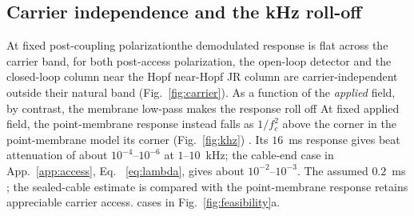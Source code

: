 \documentclass[11pt,a4paper]{article}
\providecommand{\DIFaddtex}[1]{{\protect\color{blue} \sf #1}} %
\providecommand{\DIFdeltex}[1]{{\protect\color{red} \scriptsize #1}} %
\providecommand{\DIFaddbegin}{} %
\providecommand{\DIFaddend}{} %
\providecommand{\DIFdelbegin}{} %
\providecommand{\DIFdelend}{} %
\providecommand{\DIFadd}[1]{\texorpdfstring{\DIFaddtex{#1}}{#1}} %
\providecommand{\DIFdel}[1]{\texorpdfstring{\DIFdeltex{#1}}{}} %
\begin{document}
\subsection{Carrier independence and the kHz roll-off}
At fixed \DIFdelbegin \DIFdel{post-coupling polarizationthe demodulated response is flat across the
carrier band, for both }\DIFdelend \DIFaddbegin \DIFadd{post-access polarization, }\DIFaddend the open-loop detector and \DIFdelbegin \DIFdel{the closed-loop column near the Hopf
}\DIFdelend \DIFaddbegin \DIFadd{near-Hopf
JR column are carrier-independent outside their natural band
}\DIFaddend (Fig.~\ref{fig:carrier}). \DIFdelbegin \DIFdel{As a function of
the \emph{applied} field, by contrast, the membrane low-pass makes the response roll
off }\DIFdelend \DIFaddbegin \DIFadd{At fixed applied field, the point-membrane
response instead falls }\DIFaddend as $1/f_c^2$ above \DIFdelbegin \DIFdel{the corner
in the point-membrane model
}\DIFdelend \DIFaddbegin \DIFadd{its corner
}\DIFaddend (Fig.~\ref{fig:khz})\DIFdelbegin \DIFdel{. Its $16$~ms response gives beat attenuation of about
$10^{-4}$--$10^{-6}$ at $1$--$10$~kHz; the cable-end case in App.~\ref{app:access}, Eq.
~\eqref{eq:lambda}, gives about $10^{-2}$--$10^{-3}$.
The assumed $0.2$~ms }\DIFdelend \DIFaddbegin \DIFadd{; the sealed-cable estimate is compared with the
}\DIFaddend point-membrane \DIFdelbegin \DIFdel{response retains appreciable carrier access.
}\DIFdelend \DIFaddbegin \DIFadd{cases in Fig.~\ref{fig:feasibility}a.
}\DIFaddend
\end{document}

